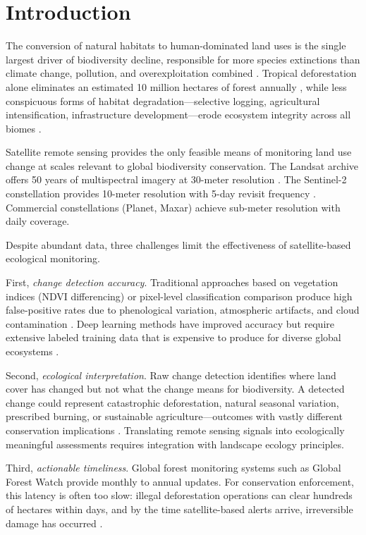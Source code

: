 \documentclass[11pt,a4paper]{article}
\begin{document}
\section{Introduction}
\label{sec:introduction}

The conversion of natural habitats to human-dominated land uses is the single largest driver of biodiversity decline, responsible for more species extinctions than climate change, pollution, and overexploitation combined \citep{maxwell2016biodiversity}.
Tropical deforestation alone eliminates an estimated 10 million hectares of forest annually \citep{fao2020global}, while less conspicuous forms of habitat degradation---selective logging, agricultural intensification, infrastructure development---erode ecosystem integrity across all biomes \citep{watson2018decline}.

Satellite remote sensing provides the only feasible means of monitoring land use change at scales relevant to global biodiversity conservation.
The Landsat archive offers 50 years of multispectral imagery at 30-meter resolution \citep{wulder2019current}.
The Sentinel-2 constellation provides 10-meter resolution with 5-day revisit frequency \citep{drusch2012sentinel}.
Commercial constellations (Planet, Maxar) achieve sub-meter resolution with daily coverage.

Despite abundant data, three challenges limit the effectiveness of satellite-based ecological monitoring.

First, \emph{change detection accuracy}.
Traditional approaches based on vegetation indices (NDVI differencing) or pixel-level classification comparison produce high false-positive rates due to phenological variation, atmospheric artifacts, and cloud contamination \citep{zhu2017change}.
Deep learning methods have improved accuracy but require extensive labeled training data that is expensive to produce for diverse global ecosystems \citep{yuan2021deep}.

Second, \emph{ecological interpretation}.
Raw change detection identifies where land cover has changed but not what the change means for biodiversity.
A detected change could represent catastrophic deforestation, natural seasonal variation, prescribed burning, or sustainable agriculture---outcomes with vastly different conservation implications \citep{redford2003empty}.
Translating remote sensing signals into ecologically meaningful assessments requires integration with landscape ecology principles.

Third, \emph{actionable timeliness}.
Global forest monitoring systems such as Global Forest Watch \citep{hansen2013high} provide monthly to annual updates.
For conservation enforcement, this latency is often too slow: illegal deforestation operations can clear hundreds of hectares within days, and by the time satellite-based alerts arrive, irreversible damage has occurred \citep{finer2018combating}.
\end{document}

